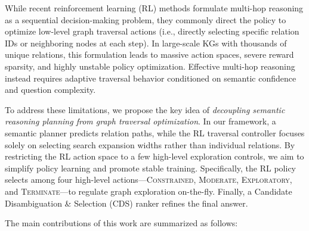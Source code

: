 \documentclass[10pt,conference]{IEEEtran}
\begin{document}
While recent reinforcement learning (RL) methods formulate multi-hop reasoning as a sequential decision-making problem, they commonly direct the policy to optimize low-level graph traversal actions (i.e., directly selecting specific relation IDs or neighboring nodes at each step). In large-scale KGs with thousands of unique relations, this formulation leads to massive action spaces, severe reward sparsity, and highly unstable policy optimization. Effective multi-hop reasoning instead requires adaptive traversal behavior conditioned on semantic confidence and question complexity.

To address these limitations, we propose the key idea of \emph{decoupling semantic reasoning planning from graph traversal optimization}. In our framework, a semantic planner predicts relation paths, while the RL traversal controller focuses solely on selecting search expansion widths rather than individual relations. By restricting the RL action space to a few high-level exploration controls, we aim to simplify policy learning and promote stable training. Specifically, the RL policy selects among four high-level actions—\textsc{Constrained}, \textsc{Moderate}, \textsc{Exploratory}, and \textsc{Terminate}—to regulate graph exploration on-the-fly. Finally, a Candidate Disambiguation \& Selection (CDS) ranker refines the final answer.

The main contributions of this work are summarized as follows:
\end{document}
